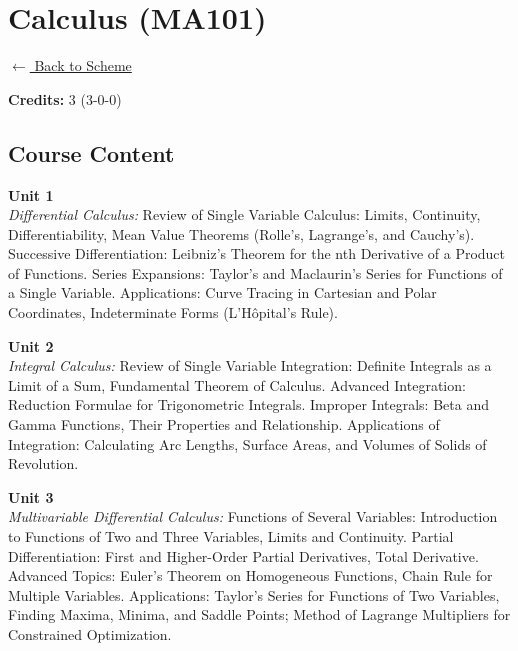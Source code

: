\section*{Calculus (MA101)}
\label{course:MA101}

\noindent \small{\hyperref[main:scheme]{$\leftarrow$ Back to Scheme}} \vspace{0.5cm}

\noindent \textbf{Credits:} 3 (3-0-0)

\subsection*{Course Content}
\noindent\textbf{Unit 1} \\
\textit{Differential Calculus:} Review of Single Variable Calculus: Limits, Continuity, Differentiability, Mean Value Theorems (Rolle’s, Lagrange’s, and Cauchy’s). Successive Differentiation: Leibniz’s Theorem for the nth Derivative of a Product of Functions. Series Expansions: Taylor’s and Maclaurin’s Series for Functions of a Single Variable. Applications: Curve Tracing in Cartesian and Polar Coordinates, Indeterminate Forms (L’Hôpital’s Rule).

\vspace{0.3cm}

\noindent\textbf{Unit 2} \\
\textit{Integral Calculus:} Review of Single Variable Integration: Definite Integrals as a Limit of a Sum, Fundamental Theorem of Calculus. Advanced Integration: Reduction Formulae for Trigonometric Integrals. Improper Integrals: Beta and Gamma Functions, Their Properties and Relationship. Applications of Integration: Calculating Arc Lengths, Surface Areas, and Volumes of Solids of Revolution.

\vspace{0.3cm}

\noindent\textbf{Unit 3} \\
\textit{Multivariable Differential Calculus:} Functions of Several Variables: Introduction to Functions of Two and Three Variables, Limits and Continuity. Partial Differentiation: First and Higher-Order Partial Derivatives, Total Derivative. Advanced Topics: Euler’s Theorem on Homogeneous Functions, Chain Rule for Multiple Variables. Applications: Taylor’s Series for Functions of Two Variables, Finding Maxima, Minima, and Saddle Points; Method of Lagrange Multipliers for Constrained Optimization.

\vspace{0.3cm}

